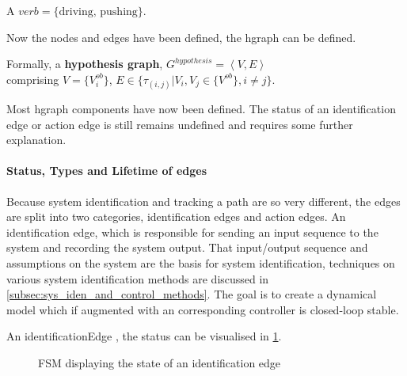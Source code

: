 A $verb = \{\textrm{driving, pushing}\}$.\bs

Now the nodes and edges have been defined, the \ac{hgraph} can be defined.\bs

Formally, a \textbf{hypothesis graph}, $G^{hypothesis} = \left\langle V, E \right\rangle $ 
\\comprising $V = \{V^{ob}_{i}\}$, \quad $E \in \{\tau_{(i,j)}| V_i, V_j \in \{V^{ob} \}, i \neq j\}$.\bs

Most \ac{hgraph} components have now been defined. The status of an identification edge or action edge is still remains undefined and requires some further explanation.\bs

\paragraph{Status, Types and Lifetime of edges}
Because system identification and tracking a path are so very different, the edges are split into two categories, identification edges and action edges. An identification edge, which is responsible for sending an input sequence to the system and recording the system output. That input/output sequence and assumptions on the system are the basis for system identification, techniques on various system identification methods are discussed in \cref{subsec:sys_iden_and_control_methods}. The goal is to create a dynamical model which if augmented with an corresponding controller is closed-loop stable.\bs

An identificationEdge , the status can be visualised in \cref{tikz:status_identification_edge}.\bs

\begin{figure}[H]
\centering
{}
\caption{\acs{FSM} displaying the state of an identification edge}%
\label{tikz:status_identification_edge}
\end{figure}

